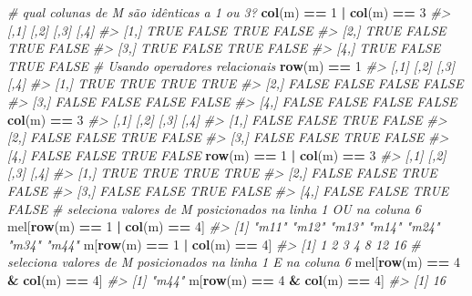 \documentclass[]{book}
\newenvironment{Shaded}{\begin{snugshade}}{\end{snugshade}}
\newcommand{\KeywordTok}[1]{\textcolor[rgb]{0.13,0.29,0.53}{\textbf{#1}}}
\newcommand{\DecValTok}[1]{\textcolor[rgb]{0.00,0.00,0.81}{#1}}
\newcommand{\StringTok}[1]{\textcolor[rgb]{0.31,0.60,0.02}{#1}}
\newcommand{\CommentTok}[1]{\textcolor[rgb]{0.56,0.35,0.01}{\textit{#1}}}
\newcommand{\OperatorTok}[1]{\textcolor[rgb]{0.81,0.36,0.00}{\textbf{#1}}}
\newcommand{\NormalTok}[1]{#1}
\begin{document}
\begin{Shaded}
\begin{Highlighting}[]
\CommentTok{# qual colunas de M são idênticas a 1 ou 3?}
\KeywordTok{col}\NormalTok{(m) }\OperatorTok{==}\StringTok{ }\DecValTok{1} \OperatorTok{|}\StringTok{ }\KeywordTok{col}\NormalTok{(m) }\OperatorTok{==}\StringTok{ }\DecValTok{3}
\CommentTok{#>      [,1]  [,2] [,3]  [,4]}
\CommentTok{#> [1,] TRUE FALSE TRUE FALSE}
\CommentTok{#> [2,] TRUE FALSE TRUE FALSE}
\CommentTok{#> [3,] TRUE FALSE TRUE FALSE}
\CommentTok{#> [4,] TRUE FALSE TRUE FALSE}
\CommentTok{# Usando operadores relacionais}
\KeywordTok{row}\NormalTok{(m) }\OperatorTok{==}\StringTok{ }\DecValTok{1}
\CommentTok{#>       [,1]  [,2]  [,3]  [,4]}
\CommentTok{#> [1,]  TRUE  TRUE  TRUE  TRUE}
\CommentTok{#> [2,] FALSE FALSE FALSE FALSE}
\CommentTok{#> [3,] FALSE FALSE FALSE FALSE}
\CommentTok{#> [4,] FALSE FALSE FALSE FALSE}
\KeywordTok{col}\NormalTok{(m) }\OperatorTok{==}\StringTok{ }\DecValTok{3}
\CommentTok{#>       [,1]  [,2] [,3]  [,4]}
\CommentTok{#> [1,] FALSE FALSE TRUE FALSE}
\CommentTok{#> [2,] FALSE FALSE TRUE FALSE}
\CommentTok{#> [3,] FALSE FALSE TRUE FALSE}
\CommentTok{#> [4,] FALSE FALSE TRUE FALSE}
\KeywordTok{row}\NormalTok{(m) }\OperatorTok{==}\StringTok{ }\DecValTok{1} \OperatorTok{|}\StringTok{ }\KeywordTok{col}\NormalTok{(m) }\OperatorTok{==}\StringTok{ }\DecValTok{3}
\CommentTok{#>       [,1]  [,2] [,3]  [,4]}
\CommentTok{#> [1,]  TRUE  TRUE TRUE  TRUE}
\CommentTok{#> [2,] FALSE FALSE TRUE FALSE}
\CommentTok{#> [3,] FALSE FALSE TRUE FALSE}
\CommentTok{#> [4,] FALSE FALSE TRUE FALSE}
\CommentTok{# seleciona valores de M posicionados na linha 1 OU na coluna 6}
\NormalTok{mel[}\KeywordTok{row}\NormalTok{(m) }\OperatorTok{==}\StringTok{ }\DecValTok{1} \OperatorTok{|}\StringTok{ }\KeywordTok{col}\NormalTok{(m) }\OperatorTok{==}\StringTok{ }\DecValTok{4}\NormalTok{]}
\CommentTok{#> [1] "m11" "m12" "m13" "m14" "m24" "m34" "m44"}
\NormalTok{m[}\KeywordTok{row}\NormalTok{(m) }\OperatorTok{==}\StringTok{ }\DecValTok{1} \OperatorTok{|}\StringTok{ }\KeywordTok{col}\NormalTok{(m) }\OperatorTok{==}\StringTok{ }\DecValTok{4}\NormalTok{]}
\CommentTok{#> [1]  1  2  3  4  8 12 16}
\CommentTok{# seleciona valores de M posicionados na linha 1 E na coluna 6}
\NormalTok{mel[}\KeywordTok{row}\NormalTok{(m) }\OperatorTok{==}\StringTok{ }\DecValTok{4} \OperatorTok{&}\StringTok{ }\KeywordTok{col}\NormalTok{(m) }\OperatorTok{==}\StringTok{ }\DecValTok{4}\NormalTok{]}
\CommentTok{#> [1] "m44"}
\NormalTok{m[}\KeywordTok{row}\NormalTok{(m) }\OperatorTok{==}\StringTok{ }\DecValTok{4} \OperatorTok{&}\StringTok{ }\KeywordTok{col}\NormalTok{(m) }\OperatorTok{==}\StringTok{ }\DecValTok{4}\NormalTok{]}
\CommentTok{#> [1] 16}
\end{Highlighting}
\end{Shaded}
\end{document}
